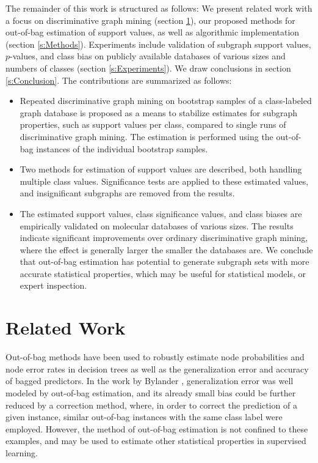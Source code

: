 \documentclass{sig-alternate}
\begin{document}
The remainder of this work is structured as follows: We present related work
with a focus on discriminative graph mining (section \ref{s:relatedWork}), our
proposed methods for out-of-bag estimation of support values, as
well as algorithmic implementation (section \ref{s:Methods}).
Experiments include validation of subgraph support
values, $p$-values, and class bias on publicly available databases of
various sizes and numbers of classes (section \ref{s:Experiments}).
We draw conclusions in section \ref{s:Conclusion}.
The contributions are summarized as follows:
\begin{itemize}
  \item Repeated discriminative graph mining on bootstrap samples of a
    class-labeled graph database is proposed as a means to stabilize estimates
    for subgraph properties, such as support values per class, compared to
    single runs of discriminative graph mining. The estimation is performed
    using the out-of-bag instances of the individual bootstrap samples.
  \item Two methods for estimation of support values are described, both
    handling multiple class values. Significance tests are applied to these
    estimated values, and insignificant subgraphs are removed from the results. 
  \item The estimated support values, class significance values, and class
    biases are empirically validated on molecular databases of various
    sizes. The results indicate significant improvements over 
    ordinary discriminative graph mining, where the effect is generally larger the
    smaller the databases are. We conclude that out-of-bag estimation has 
    potential to generate subgraph sets with more accurate statistical properties,
    which may be useful for statistical models, or expert inspection.
\end{itemize}


\section{Related Work}
\label{s:relatedWork}

Out-of-bag methods have been used to robustly estimate node probabilities and
node error rates in decision trees \cite{breiman96oob} as well as the
generalization error and accuracy of bagged predictors. In the work by Bylander
\cite{bylander02estimating}, generalization error was well modeled by
out-of-bag estimation, and its already small bias could be further reduced by a
correction method, where, in order to correct the prediction of a given
instance, similar out-of-bag instances with the same class label were
employed. However, the method of out-of-bag estimation is not confined to these
examples, and may be used to estimate other statistical properties in
supervised learning.
\end{document}
